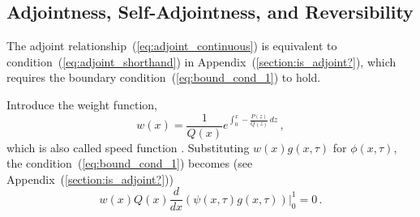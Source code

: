 \documentclass[preprint]{elsarticle}
\newcommand\eg{{\it e.g.,}}
\begin{document}
\subsection{Adjointness, Self-Adjointness, and Reversibility}


The adjoint relationship~(\ref{eq:adjoint_continuous}) is equivalent to  condition~(\ref{eq:adjoint_shorthand}) in Appendix~(\ref{section:is_adjoint?}), which requires the boundary condition~(\ref{eq:bound_cond_1}) to hold. 

Introduce the weight function, 
\begin{equation}
    w(x)=\frac1{Q(x)}e^{\int_0^x -\frac{P(z)}{Q(z)}\,dz}\,,
\end{equation}
which is also called speed function \citep[\eg][]{Ewen04,Song12}. Substituting  $w(x)g(x,\tau)$ for $\phi(x,\tau)$, the condition~(\ref{eq:bound_cond_1}) becomes (see Appendix~(\ref{section:is_adjoint?}))
\begin{equation}\label{eq:bound_cond}
w(x)Q(x)\frac{d}{d x}\left(\psi(x,\tau) g(x,\tau)\right)\big|_0^1=0\,.
\end{equation}
\end{document}
